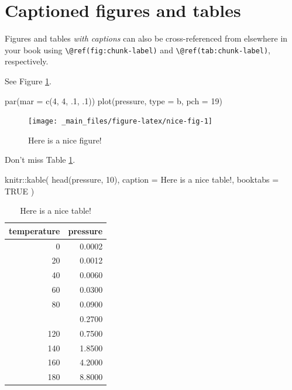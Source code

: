 \documentclass[
]{book}
\newenvironment{Shaded}{\begin{snugshade}}{\end{snugshade}}
\newcommand{\AttributeTok}[1]{\textcolor[rgb]{0.77,0.63,0.00}{#1}}
\newcommand{\ConstantTok}[1]{\textcolor[rgb]{0.00,0.00,0.00}{#1}}
\newcommand{\DecValTok}[1]{\textcolor[rgb]{0.00,0.00,0.81}{#1}}
\newcommand{\FunctionTok}[1]{\textcolor[rgb]{0.00,0.00,0.00}{#1}}
\newcommand{\NormalTok}[1]{#1}
\newcommand{\SpecialCharTok}[1]{\textcolor[rgb]{0.00,0.00,0.00}{#1}}
\newcommand{\StringTok}[1]{\textcolor[rgb]{0.31,0.60,0.02}{#1}}
\begin{document}
\hypertarget{captioned-figures-and-tables}{%
\section{Captioned figures and tables}\label{captioned-figures-and-tables}}

Figures and tables \emph{with captions} can also be cross-referenced from elsewhere in your book using \texttt{\textbackslash{}@ref(fig:chunk-label)} and \texttt{\textbackslash{}@ref(tab:chunk-label)}, respectively.

See Figure \ref{fig:nice-fig}.

\begin{Shaded}
\begin{Highlighting}[]
\FunctionTok{par}\NormalTok{(}\AttributeTok{mar =} \FunctionTok{c}\NormalTok{(}\DecValTok{4}\NormalTok{, }\DecValTok{4}\NormalTok{, .}\DecValTok{1}\NormalTok{, .}\DecValTok{1}\NormalTok{))}
\FunctionTok{plot}\NormalTok{(pressure, }\AttributeTok{type =} \StringTok{\textquotesingle{}b\textquotesingle{}}\NormalTok{, }\AttributeTok{pch =} \DecValTok{19}\NormalTok{)}
\end{Highlighting}
\end{Shaded}

\begin{figure}

{\centering \texttt{[image: \_main\_files/figure-latex/nice-fig-1]} 

}

\caption{Here is a nice figure!}\label{fig:nice-fig}
\end{figure}

Don't miss Table \ref{tab:nice-tab}.

\begin{Shaded}
\begin{Highlighting}[]
\NormalTok{knitr}\SpecialCharTok{::}\FunctionTok{kable}\NormalTok{(}
  \FunctionTok{head}\NormalTok{(pressure, }\DecValTok{10}\NormalTok{), }\AttributeTok{caption =} \StringTok{\textquotesingle{}Here is a nice table!\textquotesingle{}}\NormalTok{,}
  \AttributeTok{booktabs =} \ConstantTok{TRUE}
\NormalTok{)}
\end{Highlighting}
\end{Shaded}

\begin{table}

\caption{\label{tab:nice-tab}Here is a nice table!}
\centering
\begin{tabular}[t]{rr}
\toprule
temperature & pressure\\
\midrule
0 & 0.0002\\
20 & 0.0012\\
40 & 0.0060\\
60 & 0.0300\\
80 & 0.0900\\
\addlinespace
100 & 0.2700\\
120 & 0.7500\\
140 & 1.8500\\
160 & 4.2000\\
180 & 8.8000\\
\bottomrule
\end{tabular}
\end{table}
\end{document}
